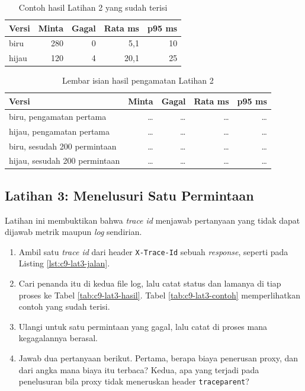 \begin{table}[!htb]
  \centering
  \caption{Contoh hasil Latihan 2 yang sudah terisi}
  \label{tab:c9-lat2-contoh}
  \begin{tabularx}{\textwidth}{Xrrrr}
    \hline
    \textbf{Versi} & \textbf{Minta} & \textbf{Gagal} & \textbf{Rata ms} & \textbf{p95 ms} \\
    \hline
    biru & 280 & 0 & 5,1 & 10 \\
    \hline
    hijau & 120 & 4 & 20,1 & 25 \\
    \hline
  \end{tabularx}
\end{table}

\begin{table}[!htb]
  \centering
  \caption{Lembar isian hasil pengamatan Latihan 2}
  \label{tab:c9-lat2-hasil}
  \begin{tabularx}{\textwidth}{Xrrrr}
    \hline
    \textbf{Versi} & \textbf{Minta} & \textbf{Gagal} & \textbf{Rata ms} & \textbf{p95 ms} \\
    \hline
    biru, pengamatan pertama & \dots & \dots & \dots & \dots \\
    \hline
    hijau, pengamatan pertama & \dots & \dots & \dots & \dots \\
    \hline
    biru, sesudah 200 permintaan & \dots & \dots & \dots & \dots \\
    \hline
    hijau, sesudah 200 permintaan & \dots & \dots & \dots & \dots \\
    \hline
  \end{tabularx}
\end{table}

\subsection*{Latihan 3: Menelusuri Satu Permintaan}

Latihan ini membuktikan bahwa \textit{trace id} menjawab pertanyaan yang
tidak dapat dijawab metrik maupun \textit{log} sendirian.

\begin{enumerate}
  \item Ambil satu \textit{trace id} dari header \texttt{X-Trace-Id} sebuah
        \textit{response}, seperti pada Listing \ref{lst:c9-lat3-jalan}.
  \item Cari penanda itu di kedua file log, lalu catat status dan lamanya di
        tiap proses ke Tabel \ref{tab:c9-lat3-hasil}. Tabel
        \ref{tab:c9-lat3-contoh} memperlihatkan contoh yang sudah terisi.
  \item Ulangi untuk satu permintaan yang gagal, lalu catat di proses mana
        kegagalannya berasal.
  \item Jawab dua pertanyaan berikut. Pertama, berapa biaya penerusan
        proxy, dan dari angka mana biaya itu terbaca? Kedua, apa yang
        terjadi pada penelusuran bila proxy tidak meneruskan header
        \texttt{traceparent}?
\end{enumerate}

